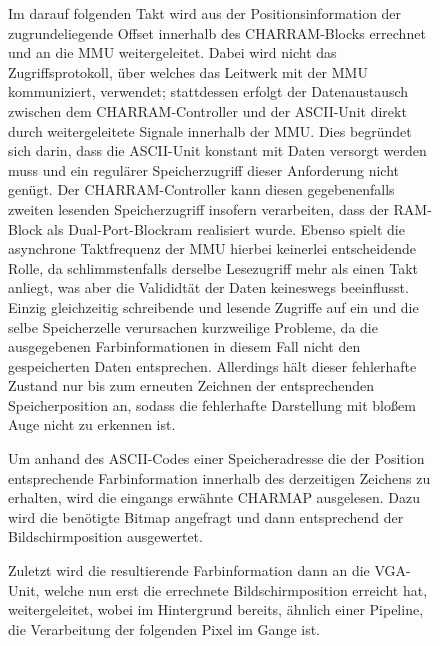 \begin{figure}[H]
Im darauf folgenden Takt wird aus der Positionsinformation der zugrundeliegende Offset innerhalb des CHARRAM-Blocks errechnet und an die MMU weitergeleitet. Dabei wird nicht das Zugriffsprotokoll, \"uber welches das Leitwerk mit der MMU kommuniziert, verwendet; stattdessen erfolgt der Datenaustausch zwischen dem CHARRAM-Controller und der ASCII-Unit direkt durch weitergeleitete Signale innerhalb der MMU. Dies begr\"undet sich darin, dass die ASCII-Unit konstant mit Daten versorgt werden muss und ein regul\"arer Speicherzugriff dieser Anforderung nicht gen\"ugt. Der CHARRAM-Controller kann diesen gegebenenfalls zweiten lesenden Speicherzugriff insofern verarbeiten, dass der RAM-Block als Dual-Port-Blockram realisiert wurde. Ebenso spielt die asynchrone Taktfrequenz der MMU hierbei keinerlei entscheidende Rolle, da schlimmstenfalls derselbe Lesezugriff mehr als einen Takt anliegt, was aber die Valididt\"at der Daten keineswegs beeinflusst. Einzig gleichzeitig schreibende und lesende Zugriffe auf ein und die selbe Speicherzelle verursachen kurzweilige Probleme, da die ausgegebenen Farbinformationen in diesem Fall nicht den gespeicherten Daten entsprechen. Allerdings h\"alt dieser fehlerhafte Zustand nur bis zum erneuten Zeichnen der entsprechenden Speicherposition an, sodass die fehlerhafte Darstellung mit blo\ss{}em Auge nicht zu erkennen ist.

Um anhand des ASCII-Codes einer Speicheradresse die der Position entsprechende Farbinformation innerhalb des derzeitigen Zeichens zu erhalten, wird die eingangs erw\"ahnte CHARMAP ausgelesen. Dazu wird die ben\"otigte Bitmap angefragt und dann entsprechend der Bildschirmposition ausgewertet. 

Zuletzt wird die resultierende Farbinformation dann an die VGA-Unit, welche nun erst die errechnete Bildschirmposition erreicht hat, weitergeleitet, wobei im Hintergrund bereits, \"ahnlich einer Pipeline, die Verarbeitung der folgenden Pixel im Gange ist.


\end{figure}
